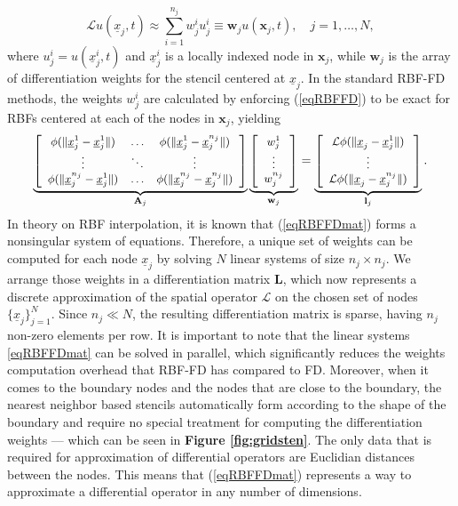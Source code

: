 \documentclass{UUThesisTemplate}
\begin{document}
\begin{equation}
\mathcal{L}u(\underline{x}_j, t)\approx\sum_{i=1}^{n_j}{w}_{j}^{i}u_j^{i}\equiv \mathbf{w}_j u(\mathbf{x}_j, t),\quad j=1,\ldots,N,
\label{eqRBFFD}
\end{equation}
where $u_j^{i}=u(\underline{x}_j^i,t)$ and $\underline{x}_j^i$ is a locally indexed node in $\mathbf{x}_j$, while $\mathbf{w}_j$ is the array of differentiation weights for the stencil centered at $\underline{x}_j$. In the standard RBF-FD methods, the weights ${w}_j^i$ are calculated by enforcing (\ref{eqRBFFD}) to be exact for RBFs centered at each of the nodes in $\mathbf{x}_j$, yielding
\begin{equation}
\label{eqRBFFDmat}
{\footnotesize{
\underbrace{\left[\begin{array}{cccc}
\phi(\|\underline{x}_j^{1}-\underline{x}_j^{1}\|) & \ldots & \phi(\|\underline{x}_j^{1}-\underline{x}_{j}^{n_j}\|)\\
\vdots & \ddots & \vdots\\
\phi(\|\underline{x}_{j}^{n_j}-\underline{x}_j^{1}\|) & \ldots & \phi(\|\underline{x}_{j}^{n_j}-\underline{x}_{j}^{n_j}\|)
\end{array}\right]}_{\mathbf{A}_j} \underbrace{\left[\begin{array}{c}
{w}_j^{1}\\
\vdots\\
{w}_{j}^{n_j}
\end{array}\right]}_{\mathbf{w}_j}=
\underbrace{\left[\begin{array}{c}
\mathcal{L}\phi(\|\underline{x}_{j}-\underline{x}_j^{1}\|)\\
\vdots \\
\mathcal{L}\phi(\|\underline{x}_{j}-\underline{x}_{{j}}^{n_j}\|)
\end{array}\right]}_{\mathbf{l}_j}.}}
\end{equation}
In theory on RBF interpolation, it is known that (\ref{eqRBFFDmat}) forms a nonsingular system of equations. Therefore, a unique set of weights can be computed for each node $\underline{x}_j$ by solving $N$ linear systems of size $n_j\times n_j$. We arrange those weights in a differentiation matrix $\mathbf{L}$, which now represents a discrete approximation of the spatial operator $\mathcal{L}$ on the chosen set of nodes $\{\underline{x}_j\}_{j=1}^N$. Since $n_j \ll N$, the resulting differentiation matrix is sparse, having $n_j$ non-zero elements per row. It is important to note that the linear systems \eqref{eqRBFFDmat} can be solved in parallel, which significantly reduces the weights computation overhead that RBF-FD has compared to FD. Moreover, when it comes to the boundary nodes and the nodes that are close to the boundary, the nearest neighbor based stencils automatically form according to the shape of the boundary and require no special treatment for computing the differentiation weights --- which can be seen in \textbf{Figure \ref{fig:gridsten}}. The only data that is required for approximation of differential operators are Euclidian distances between the nodes. This means that (\ref{eqRBFFDmat}) represents a way to approximate a differential operator in any number of dimensions.
\end{document}
